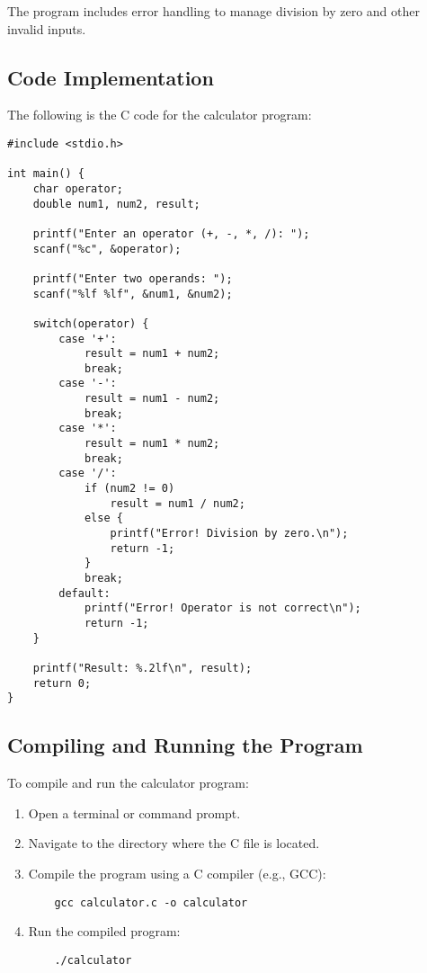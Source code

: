 \documentclass[a4paper,12pt]{article}
\begin{document}
The program includes error handling to manage division by zero and other invalid inputs.

\subsection{Code Implementation}
The following is the C code for the calculator program:

\begin{verbatim}
#include <stdio.h>

int main() {
    char operator;
    double num1, num2, result;

    printf("Enter an operator (+, -, *, /): ");
    scanf("%c", &operator);

    printf("Enter two operands: ");
    scanf("%lf %lf", &num1, &num2);

    switch(operator) {
        case '+':
            result = num1 + num2;
            break;
        case '-':
            result = num1 - num2;
            break;
        case '*':
            result = num1 * num2;
            break;
        case '/':
            if (num2 != 0)
                result = num1 / num2;
            else {
                printf("Error! Division by zero.\n");
                return -1;
            }
            break;
        default:
            printf("Error! Operator is not correct\n");
            return -1;
    }

    printf("Result: %.2lf\n", result);
    return 0;
}
\end{verbatim}

\subsection{Compiling and Running the Program}
To compile and run the calculator program:
\begin{enumerate}
    \item Open a terminal or command prompt.
    \item Navigate to the directory where the C file is located.
    \item Compile the program using a C compiler (e.g., GCC):
    \begin{verbatim}
    gcc calculator.c -o calculator
    \end{verbatim}
    \item Run the compiled program:
    \begin{verbatim}
    ./calculator
    \end{verbatim}
\end{enumerate}
\end{document}
